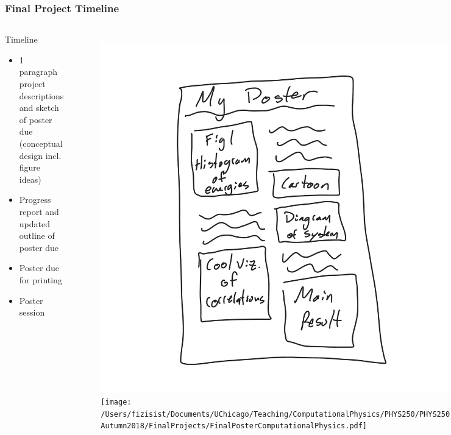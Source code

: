 \documentclass[hyperref={colorlinks=true}]{beamer}
\begin{document}

\begin{frame}%
  \frametitle{Final Project Timeline}

  \begin{columns}
  
    
  \begin{ucblock}{Timeline}
    \begin{itemize}
      \item {} 1 paragraph project descriptions and sketch of poster due (conceptual design incl. figure ideas)
      \item {} Progress report and updated outline of poster due
      \item {} Poster due for printing
      \item {} Poster session
    \end{itemize}
  \end{ucblock}
  
  
  \vspace{-1cm}
  
  \begin{figure}
    \includegraphics[width=0.9\columnwidth]{PosterConcept.png}\\
    \texttt{[image: /Users/fizisist/Documents/UChicago/Teaching/ComputationalPhysics/PHYS250/PHYS250-Autumn2018/FinalProjects/FinalPosterComputationalPhysics.pdf]}\\
  \end{figure}

  
  \end{columns}

  
\end{frame}
\end{document}
